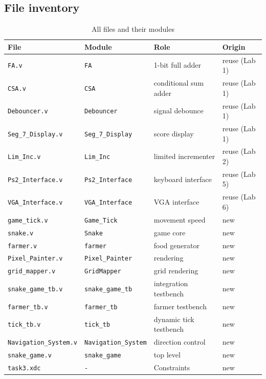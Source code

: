 \documentclass[11pt,a4paper]{article}
\begin{document}
\subsection{File inventory}
\begin{table}[H]
  \centering\small
  \caption{All files and their modules}
  \label{tab:files}
  \begin{tabular}{llll}
    \toprule
    \textbf{File} & \textbf{Module} & \textbf{Role} & \textbf{Origin} \\
    \midrule
    \texttt{FA.v}                 & \texttt{FA}                 & 1-bit full adder           & reuse (Lab 1) \\
    \texttt{CSA.v}                & \texttt{CSA}                & conditional sum adder & reuse (Lab 1) \\
    \texttt{Debouncer.v}          & \texttt{Debouncer}          & signal debounce      & reuse (Lab 1) \\
    \texttt{Seg\_7\_Display.v}    & \texttt{Seg\_7\_Display}    & score display        & reuse (Lab 1) \\
    \texttt{Lim\_Inc.v}           & \texttt{Lim\_Inc}           & limited incrementer  & reuse (Lab 2) \\
    \texttt{Ps2\_Interface.v}     & \texttt{Ps2\_Interface}     & keyboard interface   & reuse (Lab 5) \\
    \texttt{VGA\_Interface.v}     & \texttt{VGA\_Interface}     & VGA interface        & reuse (Lab 6) \\
    \midrule
    \texttt{game\_tick.v}         & \texttt{Game\_Tick}         & movement speed      & new \\
    \texttt{snake.v}              & \texttt{Snake}              & game core            & new \\
    \texttt{farmer.v}             & \texttt{farmer}             & food generator       & new \\
    \texttt{Pixel\_Painter.v}     & \texttt{Pixel\_Painter}     & rendering            & new \\
    \texttt{grid\_mapper.v}       & \texttt{GridMapper}         & grid rendering         & new \\
    \texttt{snake\_game\_tb.v}    & \texttt{snake\_game\_tb}    & integration testbench & new \\
    \texttt{farmer\_tb.v}         & \texttt{farmer\_tb}         & farmer testbench        & new \\
    \texttt{tick\_tb.v}           & \texttt{tick\_tb}           & dynamic tick testbench        & new \\
    \texttt{Navigation\_System.v} & \texttt{Navigation\_System} & direction control    & new \\
    \texttt{snake\_game.v}        & \texttt{snake\_game}        & top level            & new \\
    \midrule
    \texttt{task3.xdc}        & \texttt{-}        & Constraints            & new \\
    \bottomrule
  \end{tabular}
\end{table}
\end{document}
